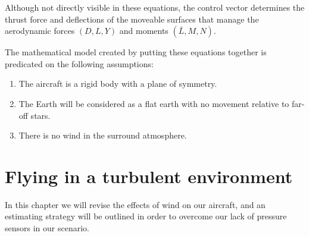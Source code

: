 \documentclass[conference]{IEEEtran}
\begin{document}
Although not directly visible in these equations, the control vector determines the thrust force and deflections of the moveable surfaces that manage the aerodynamic forces ${(D, L, Y)}$ and moments ${(\bar{L},  M,  N)}$.
\par
The mathematical model created by putting these equations together is
predicated on the following assumptions:
\par
\begin{enumerate}
    \item The aircraft is a rigid body with a plane of symmetry.
    \item The Earth will be considered as a flat earth with no movement relative to
          far-off stars.
    \item There is no wind in the surround atmosphere.
\end{enumerate}

\section{Flying in a turbulent environment}
In this chapter we will revise the effects of wind on our aircraft, and an
estimating strategy will be outlined in order to overcome our lack of pressure
sensors in our scenario.

\end{document}
